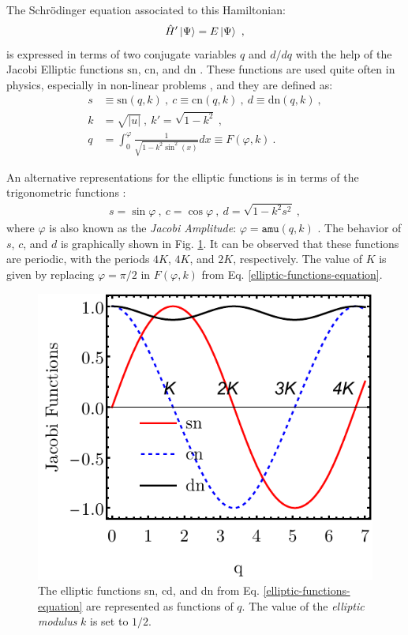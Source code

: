 The Schrödinger equation associated to this Hamiltonian:
\begin{align}
    \hat{H}'\ket{\Psi}=E\ket{\Psi}\ ,
\end{align}
is expressed in terms of two conjugate variables $q$ and $d/dq$ with the help of the Jacobi Elliptic functions $\text{sn}$, $\text{cn}$, and $\text{dn}$ \cite{jacobi1829fundamenta,akhiezer1990elements}. These functions are used quite often in physics, especially in non-linear problems \cite{kovacic2016jacobi}, and they are defined as:
\begin{align}
    s&\equiv\text{sn}(q,k)\ ,\ c\equiv\text{cn}(q,k)\ ,\ d\equiv\text{dn}(q,k)\ ,\nonumber\\
    k&=\sqrt{|u|}\ ,\ k'=\sqrt{1-k^2}\ ,\nonumber\\
    q&=\int_0^\varphi \frac{1}{\sqrt{1-k^2\sin^2(x)}}dx\equiv F(\varphi,k)\ .
    \label{elliptic-functions-equation}
\end{align}

An alternative representations for the elliptic functions is in terms of the trigonometric functions \cite{weisstein2002jacobi}:
\begin{align}
    s=\sin\varphi\ ,\ c=\cos\varphi\ ,\ d=\sqrt{1-k^2s^2}\ ,
\end{align}
where $\varphi$ is also known as the \emph{Jacobi Amplitude}: $\varphi=\texttt{amu}(q,k)$ \cite{weisstein2002jacobiamu}. The behavior of $s$, $c$, and $d$ is graphically shown in Fig. \ref{elliptic-functions-plot}. It can be observed that these functions are periodic, with the periods $4K$, $4K$, and $2K$, respectively. The value of $K$ is given by replacing $\varphi=\pi/2$ in $F(\varphi,k)$ from Eq. \ref{elliptic-functions-equation}.
\begin{figure}
    \centering
    \includegraphics[scale=0.9]{Chapters/Figures/Jacobi-Elliptic-Functions.pdf}
    \caption{The elliptic functions sn, cd, and dn from Eq. \ref{elliptic-functions-equation} are represented as functions of $q$. The value of the \emph{elliptic modulus} $k$ is set to $1/2$.}
    \label{elliptic-functions-plot}
\end{figure}

